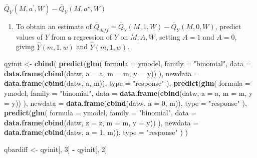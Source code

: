 \documentclass[
  12pt, krantz2,
]{book}
\makeatletter
\newenvironment{Shaded}{\begin{snugshade}}{\end{snugshade}}
\newcommand{\DataTypeTok}[1]{\textcolor[rgb]{0.13,0.29,0.53}{#1}}
\newcommand{\DecValTok}[1]{\textcolor[rgb]{0.00,0.00,0.81}{#1}}
\newcommand{\KeywordTok}[1]{\textcolor[rgb]{0.13,0.29,0.53}{\textbf{#1}}}
\newcommand{\NormalTok}[1]{#1}
\newcommand{\OperatorTok}[1]{\textcolor[rgb]{0.81,0.36,0.00}{\textbf{#1}}}
\newcommand{\StringTok}[1]{\textcolor[rgb]{0.31,0.60,0.02}{#1}}
\providecommand{\tightlist}{%
  \setlength{\itemsep}{0pt}\setlength{\parskip}{0pt}}
\newenvironment{kframe}{%
\medskip{}
\setlength{\fboxsep}{.8em}
 \def\at@end@of@kframe{}%
 \ifinner\ifhmode%
  \def\at@end@of@kframe{\end{minipage}}%
  \begin{minipage}{\columnwidth}%
 \fi\fi%
 \def\FrameCommand##1{\hskip\@totalleftmargin \hskip-\fboxsep
 \colorbox{shadecolor}{##1}\hskip-\fboxsep
     \hskip-\linewidth \hskip-\@totalleftmargin \hskip\columnwidth}%
 \MakeFramed {\advance\hsize-\width
   \@totalleftmargin\z@ \linewidth\hsize
   \@setminipage}}%
 {\par\unskip\endMakeFramed%
 \at@end@of@kframe}
\renewenvironment{Shaded}{\begin{kframe}}{\end{kframe}}
\theoremstyle{definition}
\theoremstyle{definition}
\theoremstyle{definition}
\newcommand{\1}{\mathbbm{1}}
\makeatother
\begin{document}
\(\bar{Q}_Y(M,a^\prime,W) - \bar{Q}_Y(M,a^\star,W)\)

\begin{enumerate}
\def\labelenumi{\arabic{enumi}.}
\setcounter{enumi}{2}
\tightlist
\item
  To obtain an estimate of \(\bar{Q}_{diff} = \bar{Q}_Y(M,1,W) - \bar{Q}_Y(M,0,W)\), predict values of \(Y\) from a regression of \(Y\) on \(M,A,W\),
  setting \(A=1\) and \(A=0\), giving \(\hat{Y}(m, 1, w)\) and \(\hat{Y}(m, 1, w)\).
\end{enumerate}

\begin{Shaded}
\begin{Highlighting}[]
\NormalTok{qyinit <-}\StringTok{ }\KeywordTok{cbind}\NormalTok{(}
  \KeywordTok{predict}\NormalTok{(}\KeywordTok{glm}\NormalTok{(}
    \DataTypeTok{formula =}\NormalTok{ ymodel, }\DataTypeTok{family =} \StringTok{"binomial"}\NormalTok{,}
    \DataTypeTok{data =} \KeywordTok{data.frame}\NormalTok{(}\KeywordTok{cbind}\NormalTok{(datw, }\DataTypeTok{a =}\NormalTok{ a, }\DataTypeTok{m =}\NormalTok{ m, }\DataTypeTok{y =}\NormalTok{ y))}
\NormalTok{  ),}
  \DataTypeTok{newdata =} \KeywordTok{data.frame}\NormalTok{(}\KeywordTok{cbind}\NormalTok{(datw, a, m)), }\DataTypeTok{type =} \StringTok{"response"}
\NormalTok{  ),}
  \KeywordTok{predict}\NormalTok{(}\KeywordTok{glm}\NormalTok{(}
    \DataTypeTok{formula =}\NormalTok{ ymodel, }\DataTypeTok{family =} \StringTok{"binomial"}\NormalTok{,}
    \DataTypeTok{data =} \KeywordTok{data.frame}\NormalTok{(}\KeywordTok{cbind}\NormalTok{(datw, }\DataTypeTok{a =}\NormalTok{ a, }\DataTypeTok{m =}\NormalTok{ m, }\DataTypeTok{y =}\NormalTok{ y))}
\NormalTok{  ),}
  \DataTypeTok{newdata =} \KeywordTok{data.frame}\NormalTok{(}\KeywordTok{cbind}\NormalTok{(datw, }\DataTypeTok{a =} \DecValTok{0}\NormalTok{, m)), }\DataTypeTok{type =} \StringTok{"response"}
\NormalTok{  ),}
  \KeywordTok{predict}\NormalTok{(}\KeywordTok{glm}\NormalTok{(}
    \DataTypeTok{formula =}\NormalTok{ ymodel, }\DataTypeTok{family =} \StringTok{"binomial"}\NormalTok{,}
    \DataTypeTok{data =} \KeywordTok{data.frame}\NormalTok{(}\KeywordTok{cbind}\NormalTok{(datw, }\DataTypeTok{z =}\NormalTok{ z, }\DataTypeTok{m =}\NormalTok{ m, }\DataTypeTok{y =}\NormalTok{ y))}
\NormalTok{  ),}
  \DataTypeTok{newdata =} \KeywordTok{data.frame}\NormalTok{(}\KeywordTok{cbind}\NormalTok{(datw, }\DataTypeTok{a =} \DecValTok{1}\NormalTok{, m)), }\DataTypeTok{type =} \StringTok{"response"}
\NormalTok{  )}
\NormalTok{)}

\NormalTok{qbardiff <-}\StringTok{ }\NormalTok{qyinit[, }\DecValTok{3}\NormalTok{] }\OperatorTok{-}\StringTok{ }\NormalTok{qyinit[, }\DecValTok{2}\NormalTok{]}
\end{Highlighting}
\end{Shaded}
\end{document}
